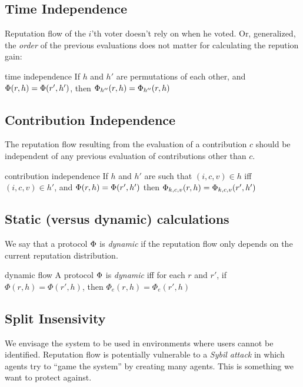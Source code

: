 \documentclass{article}
\begin{document}
\subsection{Time Independence}

Reputation flow of the $i$’th voter doesn’t rely on when he voted. Or, generalized, the {\em order} of the previous evaluations does not matter for calculating the repution gain:
\begin{condition}{time independence}
If $h$ and $h'$ are permutations of each other, and $\Phi(r, h) = \Phi(r', h')$, then $\Phi_{h''}(r, h) = \Phi_{h''}(r, h)$
\end{condition}

\subsection{Contribution Independence}

The reputation flow resulting from the evaluation of a contribution $c$ should be independent of any previous evaluation of contributions other than $c$.

\begin{condition}{contribution independence}
If $h$ and $h'$ are such that 
$(i, c, v)  \in h$ iff  $(i, c, v) \in h'$, and $\Phi(r, h) = \Phi(r', h')$ then
$\Phi_{k,c,v}(r, h) = \Phi_{k,c,v}(r', h')$
\end{condition}

\subsection{Static (versus dynamic) calculations}

We say that a protocol $\Phi$ is {\em dynamic} if the reputation flow only depends on the current reputation distribution.

\begin{condition}{dynamic flow}
A protocol $\Phi$ is {\em dynamic} iff for each $r$ and $r'$, if $\Phi(r, h) = \Phi(r', h)$, then $\Phi_{e}(r, h) = \Phi_{e}(r', h)$
\end{condition}

\subsection{Split Insensivity}

We envisage the system to be used in environments where users cannot be identified.
Reputation flow is potentially vulnerable to a {\em Sybil attack} in which agents try to ``game the system'' by creating many agents. This is something we want to protect against. 
\end{document}
